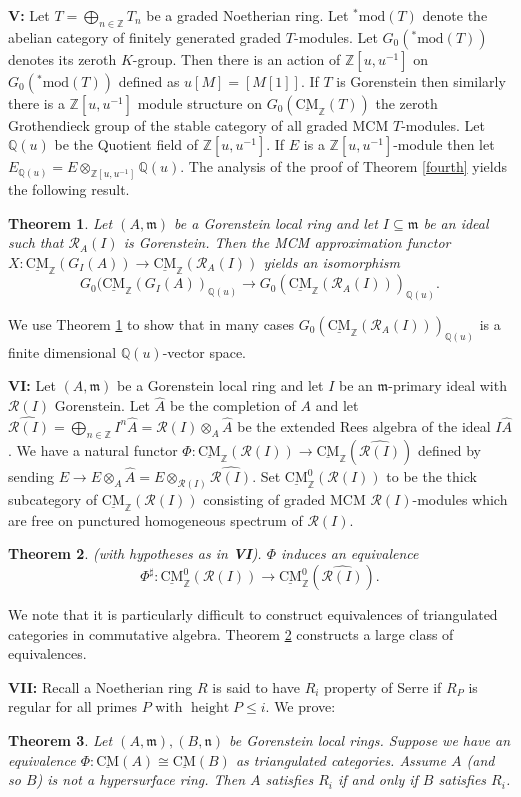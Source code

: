 \documentclass{amsart}
\newcommand{\n}{\mathfrak{n} }
\newcommand{\m}{\mathfrak{m} }
\newcommand{\Z}{\mathbb{Z} }
\newcommand{\Q}{\mathbb{Q} }
\newcommand{\eR}{\mathcal{R} }
\newcommand{\rt}{\rightarrow}
\newcommand{\wh}{\widehat }
\newcommand{\htt}{\operatorname{height}}
\newcommand{\CMS}{\operatorname{\underline{CM}}}
\newcommand{\smod}{\operatorname{^*mod}}
\theoremstyle{plain}
\newtheorem{theorem}{Theorem}[section]
\theoremstyle{definition}
\theoremstyle{remark}
\begin{document}
{\textbf{V:} Let $T = \bigoplus_{n \in \Z}T_n$ be a graded Noetherian ring. Let $\smod(T)$ denote the abelian category of finitely generated graded $T$-modules. Let $G_0(\smod(T))$ denotes its zeroth $K$-group.
Then there is an action of $\Z[u,u^{-1}]$ on $G_0(\smod(T))$  defined as $u [M] = [M[1]]$. If $T$ is Gorenstein then similarly there is a $\Z[u,u^{-1}]$ module structure on $G_0(\CMS_\Z(T))$ the  zeroth Grothendieck group of the stable category of all graded MCM $T$-modules.
Let $\Q(u)$ be the Quotient field of $\Z[u,u^{-1}]$. If $E$ is a $\Z[u, u^{-1}]$-module then let $E_{\Q(u)} = E \otimes_{\Z[u, u^{-1}]}\Q(u)$.
The analysis of the proof of Theorem \ref{fourth}  yields the following result.

\begin{theorem}
\label{fifth} Let $(A,\m)$ be a Gorenstein local ring and let $I \subseteq \m$ be an ideal such that $\eR_A(I)$ is Gorenstein. Then the MCM approximation functor \\ $X \colon \CMS_\Z(G_I(A)) \rt
\CMS_\Z(\eR_A(I))$ yields an isomorphism
$$G_0(\CMS_\Z(G_I(A))_{\Q(u)} \rt G_0(\CMS_\Z(\eR_A(I)))_{\Q(u)}.$$
\end{theorem}
We use Theorem \ref{fifth} to show that in many cases $G_0(\CMS_\Z(\eR_A(I)))_{\Q(u)}$ is a finite dimensional $\Q(u)$-vector space.


\textbf{VI:}
Let $(A,\m)$ be a Gorenstein local ring and let $I$ be an $\m$-primary ideal with $\eR(I)$ Gorenstein. Let $\wh{A}$ be the completion of $A$ and let
 $\wh{\eR(I)}= \bigoplus_{n \in \Z}I^n\wh{A} = \eR(I)\otimes_A \wh{A}$ be the extended Rees algebra of the ideal $I\wh{A}$.
 We have a natural functor $\Phi \colon \CMS_\Z(\eR(I)) \rt \CMS_\Z(\wh{\eR(I)})$ defined by sending $E \rt E\otimes_A \wh{A} = E\otimes_{\eR(I)}\wh{\eR(I)}$.
 Set $\CMS^0_\Z(\eR(I)) $ to be the thick subcategory of $\CMS_\Z(\eR(I))$ consisting of graded MCM $\eR(I)$-modules which are free on punctured homogeneous spectrum of $\eR(I)$.
\begin{theorem}
\label{equi}(with hypotheses as in \textbf{VI}).  $\Phi$ induces an equivalence  $$\Phi^\sharp \colon \CMS^0_\Z(\eR(I)) \rt \CMS^0_\Z(\wh{\eR(I)}).$$
\end{theorem}
We note that it is particularly difficult to construct equivalences of triangulated categories in commutative algebra. Theorem \ref{equi} constructs a large class of equivalences.

\textbf{VII:}
Recall a Noetherian ring $R$ is said to have $R_i$ property of Serre if $R_P$ is regular for all primes $P$ with $\htt P \leq i$. We prove:
\begin{theorem}
\label{ri}
Let $(A,\m), (B,\n) $ be  Gorenstein local rings. Suppose we have an equivalence $\Phi \colon \CMS(A) \cong \CMS(B)$ as triangulated categories. Assume $A$ (and so $B$) is not a hypersurface ring. Then $A$ satisfies $R_i$ if and only if $B$ satisfies $R_i$.
\end{theorem}

}
\end{document}
